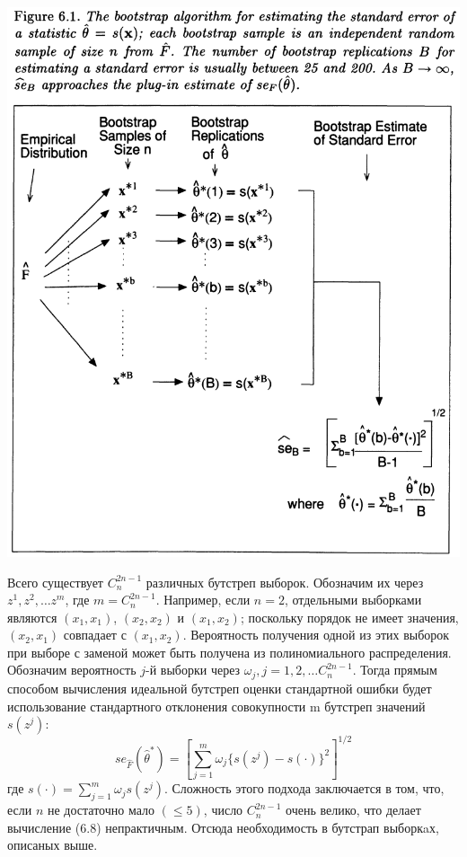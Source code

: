 \noindent
\includegraphics[width=\linewidth]{5/f61.png}
\newline

Всего существует $C_n^{2n-1}$ различных бутстреп выборок. Обозначим их через $z^1, z^2, \ldots z^m$, где $m = C_n^{2n-1}$. Например, если $n = 2$, отдельными выборками являются $(x_1, x_1)$, $(x_2, x_2)$ и $(x_1, x_2)$; поскольку порядок не имеет значения, $(x_2, x_1)$ совпадает с $(x_1, x_2)$. Вероятность получения одной из этих выборок при выборе с заменой может быть получена из полиномиального распределения. Обозначим вероятность $j$-й выборки через $\omega_j, j = 1, 2, \ldots C_n^{2n-1}$. Тогда прямым способом вычисления идеальной бутстреп оценки стандартной ошибки будет использование стандартного отклонения совокупности m бутстреп значений $s (z^j)$:
\begin{equation}
    se_{\hat F}(\hat\theta^*)=[\sum_{j=1}^m\omega_j\{s(z^j)-s(\cdot)\}^2]^{1/2}
\end{equation}
где $s (\cdot) = \sum_{j=1}^m\omega_js(z^j)$. Сложность этого подхода заключается в том, что, если $n$ не достаточно мало $(\le 5)$, число $C_n^{2n-1}$ очень велико, что делает вычисление (6.8) непрактичным. Отсюда необходимость в бутстрап выборкaх, описаных выше. 